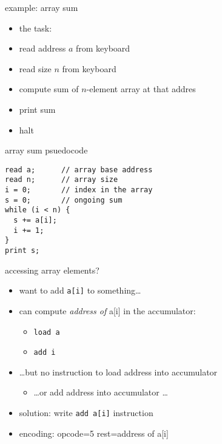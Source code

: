 \begin{frame}{example: array sum}
\begin{itemize}
\item the task:
\vspace{1cm}
\item read address $a$ from keyboard
\item read size $n$ from keyboard
\item compute sum of $n$-element array at that addres
\item print sum
\item halt
\end{itemize}
\end{frame}

\begin{frame}[fragile,label=arraySumPsuedo]{array sum psuedocode}
\begin{lstlisting}
read a;      // array base address
read n;      // array size
i = 0;       // index in the array
s = 0;       // ongoing sum
while (i < n) {
  s += a[i];
  i += 1;
}
print s;
\end{lstlisting}
\end{frame}

\begin{frame}[fragile,label=accessArrElem]{accessing array elements?}
\begin{itemize}
\item want to add \verb|a[i]| to something\ldots
\item can compute \textit{address of} a[i] in the accumulator:
    \begin{itemize}
    \item \texttt{load a}
    \item \texttt{add i}
    \end{itemize}
\item \ldots but no instruction to load address into accumulator
    \begin{itemize}
    \item \ldots or add address into accumulator \ldots
    \end{itemize}
\item solution: write \texttt{add a[i]} instruction
\item encoding: opcode=5 rest=address of a[i]
\end{itemize}
\end{frame}

